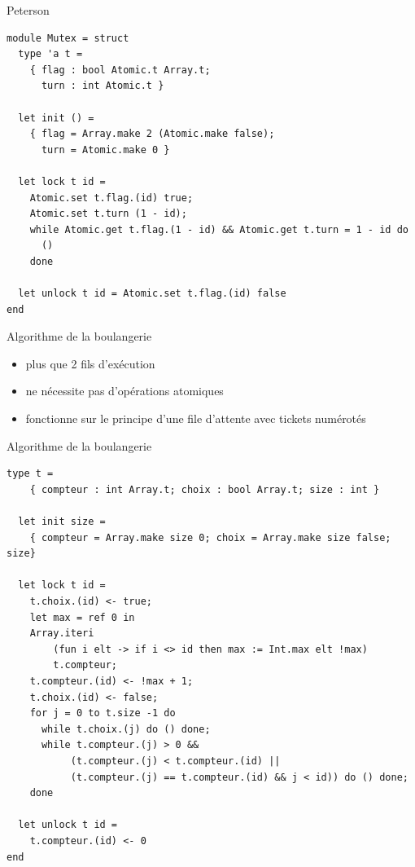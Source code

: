 \begin{frame}[fragile]{Peterson}
\begin{lstlisting}
module Mutex = struct
  type 'a t = 
    { flag : bool Atomic.t Array.t; 
      turn : int Atomic.t }

  let init () =
    { flag = Array.make 2 (Atomic.make false); 
      turn = Atomic.make 0 }

  let lock t id =
    Atomic.set t.flag.(id) true;
    Atomic.set t.turn (1 - id);
    while Atomic.get t.flag.(1 - id) && Atomic.get t.turn = 1 - id do
      ()
    done
    
  let unlock t id = Atomic.set t.flag.(id) false
end
\end{lstlisting}

\end{frame}
\begin{frame}{Algorithme de la boulangerie}
    \begin{itemize}[label=\small{}]
        \item plus que 2 fils d'exécution
        \item ne nécessite pas d'opérations atomiques
        \item fonctionne sur le principe d'une file d'attente avec tickets numérotés
    \end{itemize}
    
\end{frame}
\begin{frame}[fragile]{Algorithme de la boulangerie}
\begin{lstlisting}[basicstyle=\scriptsize\ttfamily]
  type t =
    { compteur : int Array.t; choix : bool Array.t; size : int }
    
  let init size =
    { compteur = Array.make size 0; choix = Array.make size false; size} 

  let lock t id =
    t.choix.(id) <- true;
    let max = ref 0 in
    Array.iteri 
        (fun i elt -> if i <> id then max := Int.max elt !max) 
        t.compteur;
    t.compteur.(id) <- !max + 1;
    t.choix.(id) <- false;
    for j = 0 to t.size -1 do
      while t.choix.(j) do () done;
      while t.compteur.(j) > 0 &&
           (t.compteur.(j) < t.compteur.(id) ||
           (t.compteur.(j) == t.compteur.(id) && j < id)) do () done;
    done

  let unlock t id =
    t.compteur.(id) <- 0
end
\end{lstlisting}

\end{frame}
